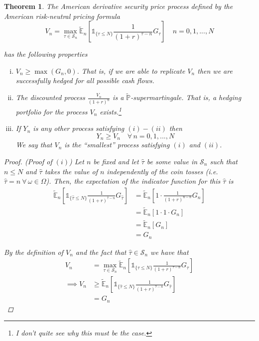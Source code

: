 \documentclass[12pt]{article}
\newtheorem{theorem}{Theorem}
\renewcommand{\P}{\mathbb P}
\newcommand{\E}{\mathbb E}
\begin{document}
\begin{theorem} The American derivative security price process defined by the American risk-neutral pricing formula
\begin{equation*}
	V_n = \max_{\tau \in \mathcal S_n} \tilde{\E}_n \left[ \mathds 1_{\{\tau\leq N\}} \frac{1}{(1 + r)^{\tau - n}} G_\tau \right] \quad n = 0,1,...,N
\end{equation*}

has the following properties
\begin{enumerate}[(i)]
	\item $V_n \geq \max(G_n, 0)$. That is, if we are able to replicate $V_n$ then we are successfully hedged for all possible cash flows.
	\item The discounted process $\frac{V_n}{(1 + r)^n}$ is a $\tilde{\P}$-supermartingale. That is, a hedging portfolio for the process $V_n$ exists.\footnote{I don't quite see why this must be the case.}
	\item If $Y_n$ is any other process satisfying $(i)-(ii)$ then
	\begin{equation*}
		Y_n \geq V_n \quad \forall\,n = 0,1,...,N
	\end{equation*}
	We say that $V_n$ is the ``smallest'' process satisfying $(i)$ and $(ii)$.
\end{enumerate}

\begin{proof} {\em (Proof of $(i)$)} Let $n$ be fixed and let $\hat{\tau}$ be some value in $\mathcal S_n$ such that $n \leq N$ and $\hat{\tau}$ takes the value of $n$ independently of the coin tosses (i.e. $\hat{\tau} = n~\forall\,\omega \in \Omega$). Then, the expectation of the indicator function for this $\hat{\tau}$ is
\begin{align*}
	\tilde{\E}_n \left[ \mathds 1_{\{\hat{\tau} \leq N\}} \frac{1}{(1 + r)^{\hat{\tau} - n}} G_{\hat{\tau}} \right] &= \tilde{\E}_n \left[ 1 \cdot \frac{1}{(1 + r)^{n - n}} G_{n} \right] \\
	&= \tilde{\E}_n \left[ 1 \cdot 1 \cdot G_{n} \right] \\
	&= \tilde{\E}_n [G_n] \\
	&= G_n
\end{align*}

By the definition of $V_n$ and the fact that $\hat{\tau} \in \mathcal S_n$ we have that
\begin{align*}
	V_n &= \max_{\tau \in \mathcal S_n} \tilde{\E}_n \left[ \mathds 1_{\{\tau\leq N\}} \frac{1}{(1 + r)^{\tau - n}} G_\tau \right] \\
	\implies V_n &\geq \tilde{\E}_n \left[ \mathds 1_{\{\hat{\tau} \leq N\}} \frac{1}{(1 + r)^{\hat{\tau} - n}} G_{\hat{\tau}} \right] \\
	&= G_n
\end{align*}


\end{proof}
\end{theorem}
\end{document}

